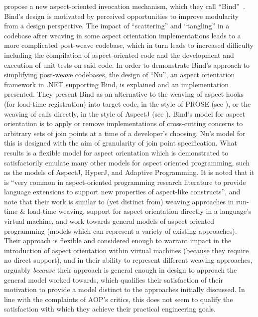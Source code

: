 




\citeauthor{rajan2006nu_towardsao_invocation} propose a new aspect-oriented
invocation mechanism, which they call
``Bind''~\cite{rajan2006nu_towardsao_invocation}. Bind's design is motivated by
perceived opportunities to improve modularity from a design perspective. The
impact of ``scattering'' and ``tangling'' in a codebase after weaving in some
aspect orientation implementations leads to a more complicated post-weave
codebase, which in turn leads to increased difficulty including the compilation
of aspect-oriented code and the development and execution of unit tests on said
code. In order to demonstrate Bind's approach to simplifying post-weave
codebases, the design of ``Nu'', an aspect orientation framework in .NET
supporting Bind, is explained and an implementation presented. They present Bind
as an alternative to the weaving of aspect hooks (for load-time registration)
into target code, in the style of PROSE (see
\cite{popovici2002PROSE,popovici2003JITaspects}), or the weaving of calls
directly, in the style of AspectJ (see \cite{aspectj_intro}). Bind's model for
aspect orientation is to apply or remove implementations of cross-cutting
concerns to arbitrary sets of join points at a time of a developer's choosing.
Nu's model for this is designed with the aim of granularity of join point
specification. What results is a flexible model for aspect orientation which is
demonstrated to satisfactorily emulate many other models for aspect oriented
programming, such as the models of AspectJ, HyperJ, and Adaptive Programming. It
is noted that it is ``very common in aspect-oriented programming research
literature to provide language extensions to support new properties of
aspect-like constructs'', and note that their work is similar to (yet distinct
from) weaving approaches in run-time \& load-time weaving, support for aspect
orientation directly in a language's virtual machine, and work towards general
models of aspect oriented programming (models which can represent a variety of
existing approaches). Their approach is flexible and considered enough to
warrant impact in the introduction of aspect orientation within virtual machines
(because they require no direct support), and in their ability to represent
different weaving approaches, arguably \emph{because} their approach is general
enough in design to approach the general model worked towards, which qualifies
their satisfaction of their motivation to provide a model distinct to the
approaches initially discussed. In line with the complaints of AOP's critics,
this does not seem to qualify the satisfaction with which they achieve their
practical engineering goals.

